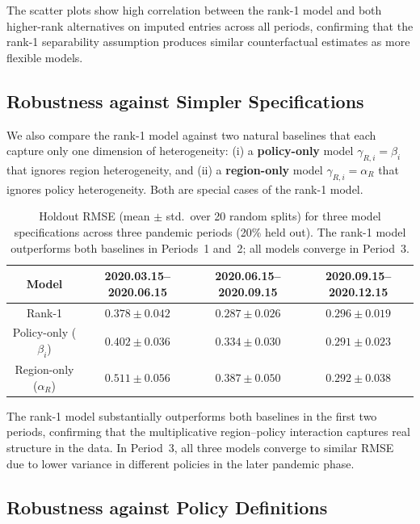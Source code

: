 \documentclass[msom,blindrev]{informs3} %
\begin{document}
\begin{APPENDICES}
{The scatter plots show high correlation between the rank-1 model and both higher-rank alternatives on imputed entries across all periods, confirming that the rank-1 separability assumption produces similar counterfactual estimates as more flexible models.

\subsection{Robustness against Simpler Specifications}
\label{app:alternative}
We also compare the rank-1 model against two natural baselines that each capture only one dimension of heterogeneity: (i) a \textbf{policy-only} model $\gamma_{R,i} = \beta_i$ that ignores region heterogeneity, and (ii) a \textbf{region-only} model $\gamma_{R,i} = \alpha_R$ that ignores policy heterogeneity. Both are special cases of the rank-1 model.

\begin{table}[h!]
\centering
\begin{tabular}{|c|c|c|c|}
\hline Model & 2020.03.15--2020.06.15 & 2020.06.15--2020.09.15 & 2020.09.15--2020.12.15\\\hline
Rank-1 & $\mathbf{0.378 \pm 0.042}$ & $\mathbf{0.287 \pm 0.026}$ & $0.296 \pm 0.019$ \\
Policy-only ($\beta_i$) & $0.402 \pm 0.036$ & $0.334 \pm 0.030$ & $0.291 \pm 0.023$ \\
Region-only ($\alpha_R$) & $0.511 \pm 0.056$ & $0.387 \pm 0.050$ & $0.292 \pm 0.038$ \\\hline
\end{tabular}
\caption{Holdout RMSE (mean $\pm$ std.\ over 20 random splits) for three model specifications across three pandemic periods (20\% held out). The rank-1 model outperforms both baselines in Periods~1 and~2; all models converge in Period~3.}
\label{tab:alt_specs}
\end{table}

The rank-1 model substantially outperforms both baselines in the first two periods, confirming that the multiplicative region--policy interaction captures real structure in the data. In Period~3, all three models converge to similar RMSE due to lower variance in different policies in the later pandemic phase.

\subsection{Robustness against Policy Definitions}
\label{app:policy}

}
\end{APPENDICES}
\end{document}
